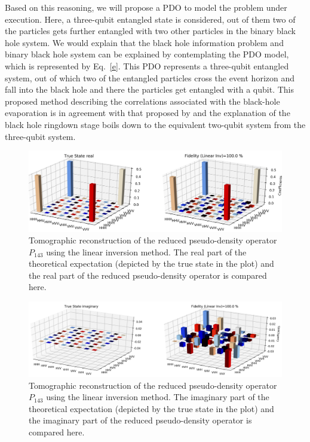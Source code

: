 \documentclass[fleqn,usenatbib]{mnras}
\begin{document}
Based on this reasoning, we will propose a PDO to model the problem under execution. Here, a three-qubit entangled state is considered, out of them two of the particles gets further entangled with two other particles in the binary black hole system. We would explain that the black hole information problem and binary black hole system can be explained by contemplating the PDO model, which is represented by Eq.~\eqref{e}. This PDO represents a three-qubit entangled system, out of which two of the entangled particles cross the event horizon and fall into the black hole and there the particles get entangled with a qubit. This proposed method describing the correlations associated with the black-hole evaporation is in agreement with that proposed by \citep{monogamy} and the explanation of the black hole ringdown stage boils down to the equivalent two-qubit system from the three-qubit system.  






\begin{figure}
\centering
	\includegraphics[width=\textwidth]{plots/three_d_plot_real_Linear Inv_crop.png}
    \caption{Tomographic reconstruction of the reduced pseudo-density operator $P_{143}$ using the linear inversion method. The real part of the theoretical expectation (depicted by the true state in the plot) and the real part of the reduced pseudo-density operator is compared here.}
    \label{f4}
\end{figure}
\begin{figure}
\centering
	\includegraphics[width=\textwidth]{plots/three_d_plot_imaginary_Linear Inv_crop.png}
    \caption{Tomographic reconstruction of the reduced pseudo-density operator $P_{143}$ using the linear inversion method. The imaginary part of the theoretical expectation (depicted by the true state in the plot) and the imaginary part of the reduced pseudo-density operator  is compared here.}
    \label{f5}
\end{figure}
\end{document}
